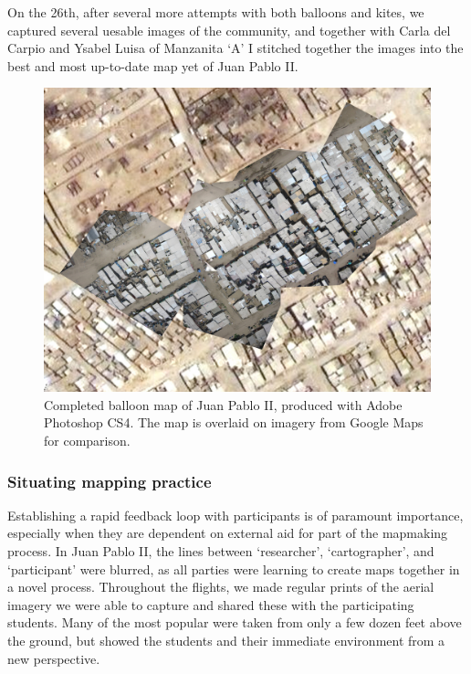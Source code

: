 \documentclass[11pt,oneside,notitlepage]{report}
\begin{document}
{{On the 26th, after several more attempts with both balloons and kites, we captured several uesable images of the community, and together with Carla del Carpio and Ysabel Luisa of Manzanita `A' I stitched together the images into the best and most up-to-date map yet of Juan Pablo II.  

\begin{figure}[h]
  \begin{center}
	\includegraphics[width=1\textwidth]{images/juan-pablo-final.jpg}
	\caption{Completed balloon map of Juan Pablo II, produced with Adobe Photoshop CS4. The map is overlaid on imagery from Google Maps for comparison.}
  \end{center}
\end{figure}

\subsubsection{Situating mapping practice}

Establishing a rapid feedback loop with participants is of paramount importance, especially when they are dependent on external aid for part of the mapmaking process. In Juan Pablo II, the lines between `researcher', `cartographer', and `participant' were blurred, as all parties were learning to create maps together in a novel process. Throughout the flights, we made regular prints of the aerial imagery we were able to capture and shared these with the participating students. Many of the most popular were taken from only a few dozen feet above the ground, but showed the students and their immediate environment from a new perspective. 

}}
\end{document}
